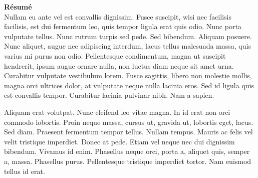 \tableofcontents


\mainmatter



\backmatter

\printbibliography
\begin{titlepage}
\vspace{2cm}
\begin{addmargin}[-1cm]{-4cm}
\begin{flushright}
\sffamily\LARGE\titleen
\end{flushright}
\vfill
\noindent
\begin{minipage}[t]{9cm}

{\sffamily\textbf{Résumé}}\\
Nullam eu ante vel est convallis dignissim.  Fusce suscipit, wisi nec facilisis
facilisis, est dui fermentum leo, quis tempor ligula erat quis odio.  Nunc porta
vulputate tellus.  Nunc rutrum turpis sed pede.  Sed bibendum.  Aliquam posuere.
Nunc aliquet, augue nec adipiscing interdum, lacus tellus malesuada massa, quis
varius mi purus non odio.  Pellentesque condimentum, magna ut suscipit
hendrerit, ipsum augue ornare nulla, non luctus diam neque sit amet urna.
Curabitur vulputate vestibulum lorem.  Fusce sagittis, libero non molestie
mollis, magna orci ultrices dolor, at vulputate neque nulla lacinia eros.  Sed
id ligula quis est convallis tempor.  Curabitur lacinia pulvinar nibh.  Nam a
sapien.

Aliquam erat volutpat.  Nunc eleifend leo vitae magna.  In id erat non orci
commodo lobortis.  Proin neque massa, cursus ut, gravida ut, lobortis eget,
lacus.  Sed diam.  Praesent fermentum tempor tellus.  Nullam tempus.  Mauris ac
felis vel velit tristique imperdiet.  Donec at pede.  Etiam vel neque nec dui
dignissim bibendum.  Vivamus id enim.  Phasellus neque orci, porta a, aliquet
quis, semper a, massa.  Phasellus purus.  Pellentesque tristique imperdiet
tortor.  Nam euismod tellus id erat.


\end{minipage}
\end{addmargin}
\end{titlepage}
